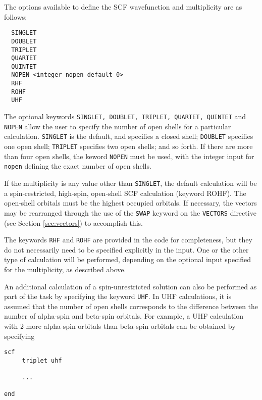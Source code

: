 The options available to define the SCF wavefunction and multiplicity are
as follows;


\begin{verbatim}
  SINGLET 
  DOUBLET 
  TRIPLET 
  QUARTET 
  QUINTET 
  NOPEN <integer nopen default 0>
  RHF
  ROHF
  UHF
\end{verbatim}

The optional keywords \verb+SINGLET, DOUBLET, TRIPLET, QUARTET, QUINTET+ 
and \verb+NOPEN+ allow the user to specify the number of open shells for a 
particular calculation.  \verb+SINGLET+ is the default, and specifies a 
closed shell; \verb+DOUBLET+ specifies one open shell; \verb+TRIPLET+
specifies two open shells; and so forth.  If there are more than four
open shells, the keword \verb+NOPEN+ must be used, with the integer input
for \verb+nopen+ defining the exact number of open shells.

If the multiplicity is any value other than \verb+SINGLET+, the default
calculation will be a spin-restricted,
high-spin, open-shell SCF calculation (keyword ROHF).  The open-shell
orbitals must be the highest occupied orbitals.  If necessary, the vectors
may be rearranged through the use of the \verb+SWAP+ keyword on the
\verb+VECTORS+ directive (see Section \ref{sec:vectors}) to accomplish this. 


The keywords \verb+RHF+ and \verb+ROHF+ are provided in
the code for completeness, but they do not necessarily need to be 
specified explicitly in the input.  One or the other type of calculation
will be performed, depending on the optional
input specified for the multiplicity, as described above.

An additional calculation of
a spin-unrestricted solution can also be performed as part of the task
by specifying the keyword \verb+UHF+.  In UHF calculations, it is
assumed that the number of open shells corresponds to the difference
between the number of alpha-spin and beta-spin orbitals.  For example, 
a UHF calculation
with 2 more alpha-spin orbitals than beta-spin orbitals can be obtained
by specifying

\begin{verbatim}
scf
     triplet uhf

     ...

end
\end{verbatim}


